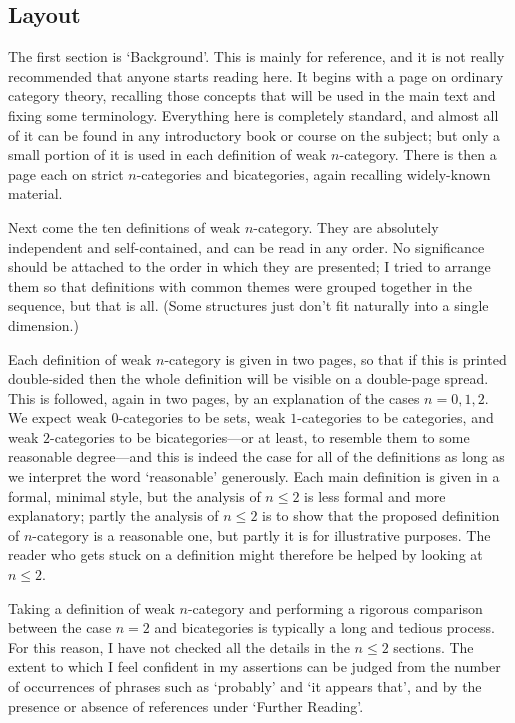 \subsection*{Layout}

The first section is `Background'.  This is mainly for reference, and it is
not really recommended that anyone starts reading here.  It begins with a
page on ordinary category theory, recalling those concepts that will be used
in the main text and fixing some terminology.  Everything here is completely
standard, and almost all of it can be found in any introductory book or
course on the subject; but only a small portion of it is used in each
definition of weak $n$-category.  There is then a page each on strict
$n$-categories and bicategories, again recalling widely-known material.

Next come the ten definitions of weak $n$-category.  They are absolutely
independent and self-contained, and can be read in any order.  No
significance should be attached to the order in which they are presented; I
tried to arrange them so that definitions with common themes were grouped
together in the sequence, but that is all.  (Some structures just don't fit
naturally into a single dimension.)

Each definition of weak $n$-category is given in two pages, so that if this
is printed double-sided then the whole definition will be visible on a
double-page spread.  This is followed, again in two pages, by an explanation
of the cases $n=0,1,2$.  We expect weak $0$-categories to be sets, weak
$1$-categories to be categories, and weak $2$-categories to be
bicategories---or at least, to resemble them to some reasonable degree---and
this is indeed the case for all of the definitions as long as we interpret
the word `reasonable' generously.  Each main definition is given in a formal,
minimal style, but the analysis of $n\leq 2$ is less formal and more
explanatory; partly the analysis of $n\leq 2$ is to show that the proposed
definition of $n$-category is a reasonable one, but partly it is for
illustrative purposes.  The reader who gets stuck on a definition might
therefore be helped by looking at $n\leq 2$.

Taking a definition of weak $n$-category and performing a rigorous comparison
between the case $n=2$ and bicategories is typically a long and tedious
process.  For this reason, I have not checked all the details in the $n\leq
2$ sections.  The extent to which I feel confident in my assertions can be
judged from the number of occurrences of phrases such as `probably' and `it
appears that', and by the presence or absence of references under `Further
Reading'.

